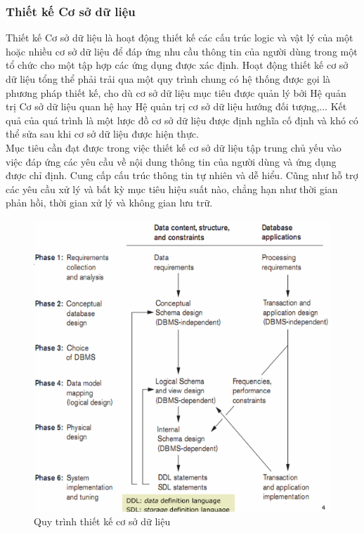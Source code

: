 \subsubsection{Thiết kế Cơ sở dữ liệu}
\hspace*{0.5cm} Thiết kế Cơ sở dữ liệu là hoạt động thiết kế các cấu trúc logic và vật lý của một hoặc nhiều cơ sở dữ liệu để đáp ứng nhu cầu thông tin của người dùng trong một tổ chức cho một tập hợp các ứng dụng được xác định. Hoạt động thiết kế cơ sở dữ liệu tổng thể phải trải qua một quy trình chung có hệ thống được gọi là phương pháp thiết kế, cho dù cơ sở dữ liệu mục tiêu được quản lý bởi Hệ quản trị Cơ sở dữ liệu quan hệ hay Hệ quản trị cơ sở dữ liệu hướng đối tượng,... Kết quả của quá trình là một lược đồ cơ sở dữ liệu được định nghĩa cố định và khó có thể sửa sau khi cơ sở dữ liệu được hiện thực.\\
\hspace*{0.5cm} Mục tiêu cần đạt được trong việc thiết kế cơ sở dữ liệu tập trung chủ yếu vào việc đáp ứng các yêu cầu về nội dung thông tin của người dùng và ứng dụng được chỉ định. Cung cấp cấu trúc thông tin tự nhiên và dễ hiểu. Cũng như hỗ trợ các yêu cầu xử lý và bất kỳ mục tiêu hiệu suất nào, chẳng hạn như thời gian phản hồi, thời gian xử lý và không gian lưu trữ.\\
\begin{figure}[H]
	\centering
	\includegraphics[width=\textwidth]{Images/DBDesign.png}
	\vspace{0.5cm}
	\caption{Quy trình thiết kế cơ sở dữ liệu}
\end{figure}
